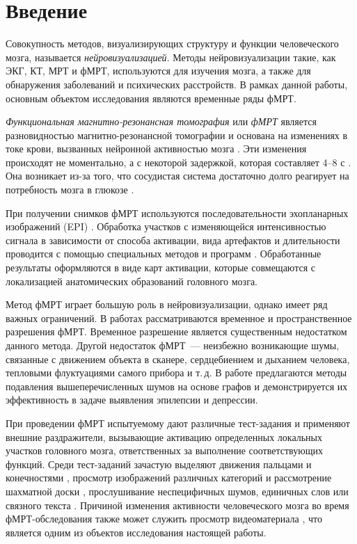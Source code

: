 \section{Введение}\label{intro}                 %
Совокупность методов, визуализирующих структуру и функции человеческого мозга,
называется \textit{нейровизуализацией}. Методы нейровизуализации \cite{puras2014neurovisualization} такие, как ЭКГ, КТ, МРТ и фМРТ,
используются для изучения мозга, а также для обнаружения заболеваний и психических расстройств. В рамках данной работы, основным объектом исследования являются временные ряды фМРТ.

\textit{Функциональная магнитно-резонансная томография} или \textit{фМРТ}
является разновидностью магнитно-резонансной томографии и основана на изменениях в токе крови,
вызванных нейронной активностью мозга \cite{Glover2011}.
Эти изменения происходят не моментально, а с некоторой задержкой,
которая составляет 4--8 с \cite{Bandettini1992}.
Она возникает из-за того, что сосудистая система достаточно долго реагирует
на потребность мозга в глюкозе \cite{Ogawa1990, LEBIHAN1995231, Logothetis2003}.

При получении снимков фМРТ используются последовательности
эхопланарных изображений (EPI) \cite{Connelly1993, Kwong1992, Ogawa1992}.
Обработка участков с изменяющейся интенсивностью сигнала в
зависимости от способа активации, вида артефактов и длительности
проводится с помощью специальных методов и программ
\cite{Bandettini1992, BAUDENDISTEL1995701, COX1996162}.
Обработанные результаты оформляются в виде карт активации,
которые совмещаются с локализацией анатомических образований
головного мозга.

Метод фМРТ играет большую роль в нейровизуализации, однако имеет ряд важных ограничений.
В работах \cite{menon1999spatial, logothetis2008we} рассматриваются
временное и пространственное разрешения фМРТ. Временное разрешение является существенным
недостатком данного метода. Другой недостаток фМРТ~--- неизбежно возникающие шумы,
связанные с движением объекта в сканере, сердцебиением и дыханием человека, тепловыми
флуктуациями самого прибора и т.\,д. В работе \cite{1804.10167} предлагаются методы
подавления вышеперечисленных шумов на основе графов и демонстрируется их эффективность в задаче
выявления эпилепсии и депрессии.

При проведении фМРТ испытуемому дают различные тест-задания и
применяют внешние раздражители, вызывающие активацию определенных
локальных участков головного мозга, ответственных за выполнение
соответствующих функций.
Среди тест-заданий зачастую выделяют движения пальцами и конечностями
\cite{Roux1998, Papke1999}, просмотр изображений различных категорий и рассмотрение
шахматной доски \cite{Engel1994, Schneider1994},
прослушивание неспецифичных шумов, единичных слов
или связного текста \cite{Binder1994, Dymarkowski1998}.
Причиной изменения активности человеческого мозга во время фМРТ-обследования
также может служить просмотр видеоматериала \cite{decety1997brain},
что является одним из объектов исследования настоящей работы.

